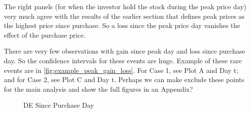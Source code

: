 The right panels (for when the investor hold the stock during the peak price day) very much agree with the results of the earlier section that defines peak prices as the highest price since purchase. So a loss  since the peak price day vanishes the effect of the purchase price.

There are very few observations with gain since peak day and loss since purchase day. So the confidence intervals for these events are huge. Example of these rare events are in \ref{fig:example_peak_gain_loss}. For Case 1, see Plot A and Day t; and for Case 2, see Plot C and Day t. Perhaps we can make exclude these points for the main analysis and show the full figures in an Appendix? \\



\begin{figure}[h]%
	\centering%
	\caption{DE Since Purchase  Day}%
	\label{fig:DE_pur_peak_hold}%
	\fignote{  }
\end{figure}


